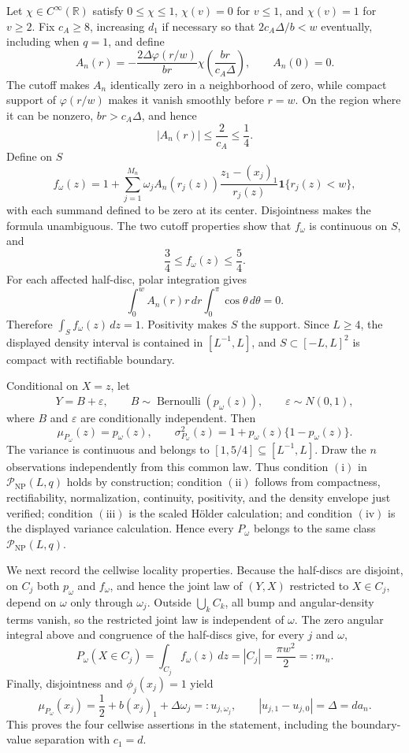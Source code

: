 Let \(\chi\in C^\infty(\mathbb R)\) satisfy \(0\leq\chi\leq1\), \(\chi(v)=0\) for \(v\leq1\), and \(\chi(v)=1\) for \(v\geq2\).  Fix \(c_A\geq8\), increasing \(d_1\) if necessary so that \(2c_A\Delta/b<w\) eventually, including when \(q=1\), and define
\[
 A_n(r)=-\frac{2\Delta\varphi(r/w)}{br}
 \chi\!\left(\frac{br}{c_A\Delta}\right),
 \qquad A_n(0)=0.
\]
The cutoff makes \(A_n\) identically zero in a neighborhood of zero, while compact support of \(\varphi(r/w)\) makes it vanish smoothly before \(r=w\).  On the region where it can be nonzero, \(br>c_A\Delta\), and hence
\[
 |A_n(r)|\leq\frac{2}{c_A}\leq\frac14.
\]
Define on \(S\)
\[
 f_\omega(z)=1+
 \sum_{j=1}^{M_n}\omega_j A_n(r_j(z))
 \frac{z_1-(x_j)_1}{r_j(z)}\mathbf 1\{r_j(z)<w\},
\]
with each summand defined to be zero at its center.  Disjointness makes the formula unambiguous.  The two cutoff properties show that \(f_\omega\) is continuous on \(S\), and
\[
 \frac34\leq f_\omega(z)\leq\frac54.
\]
For each affected half-disc, polar integration gives
\[
 \int_0^w A_n(r)r\,dr\int_0^\pi\cos\theta\,d\theta=0.
\]
Therefore \(\int_S f_\omega(z)\,dz=1\).  Positivity makes \(S\) the support.  Since \(L\geq4\), the displayed density interval is contained in \([L^{-1},L]\), and \(S\subset[-L,L]^2\) is compact with rectifiable boundary.

Conditional on \(X=z\), let
\[
 Y=B+\varepsilon,
 \qquad
 B\sim\operatorname{Bernoulli}(p_\omega(z)),
 \qquad
 \varepsilon\sim N(0,1),
\]
where \(B\) and \(\varepsilon\) are conditionally independent.  Then
\[
 \mu_{P_\omega}(z)=p_\omega(z),
 \qquad
 \sigma_{P_\omega}^2(z)=1+p_\omega(z)\{1-p_\omega(z)\}.
\]
The variance is continuous and belongs to \([1,5/4]\subseteq[L^{-1},L]\).  Draw the \(n\) observations independently from this common law.  Thus condition \(\mathrm{(i)}\) in \(\mathcal P_{\mathrm{NP}}(L,q)\) holds by construction; condition \(\mathrm{(ii)}\) follows from compactness, rectifiability, normalization, continuity, positivity, and the density envelope just verified; condition \(\mathrm{(iii)}\) is the scaled H\"older calculation; and condition \(\mathrm{(iv)}\) is the displayed variance calculation.  Hence every \(P_\omega\) belongs to the same class \(\mathcal P_{\mathrm{NP}}(L,q)\).

We next record the cellwise locality properties.  Because the half-discs are disjoint, on \(C_j\) both \(p_\omega\) and \(f_\omega\), and hence the joint law of \((Y,X)\) restricted to \(X\in C_j\), depend on \(\omega\) only through \(\omega_j\).  Outside \(\bigcup_k C_k\), all bump and angular-density terms vanish, so the restricted joint law is independent of \(\omega\).  The zero angular integral above and congruence of the half-discs give, for every \(j\) and \(\omega\),
\[
 P_\omega(X\in C_j)=\int_{C_j}f_\omega(z)\,dz
 =|C_j|=\frac{\pi w^2}{2}=:m_n.
\]
Finally, disjointness and \(\phi_j(x_j)=1\) yield
\[
 \mu_{P_\omega}(x_j)=\frac12+b(x_j)_1+\Delta\omega_j
 =:u_{j,\omega_j},
 \qquad |u_{j,1}-u_{j,0}|=\Delta=d a_n.
\]
This proves the four cellwise assertions in the statement, including the boundary-value separation with \(c_1=d\).

